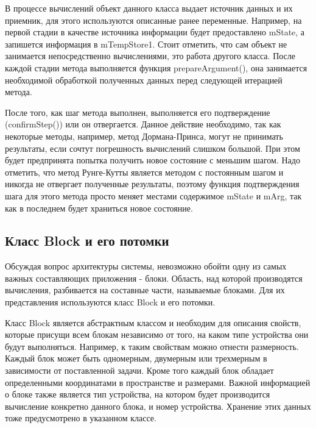 \documentclass[a4paper, 14pt]{extarticle}
\theoremstyle{definition}
\begin{document}
\par В процессе вычислений объект данного класса выдает источник данных и их приемник, для этого используются описанные ранее переменные. Например, на первой стадии в качестве источника информации будет предоставлено mState, а запишется информация в mTempStore1. Стоит отметить, что сам объект не занимается непосредственно вычислениями, это работа другого класса. После каждой стадии метода выполняется функция prepareArgument(), она занимается необходимой обработкой полученных данных перед следующей итерацией метода.

\par После того, как шаг метода выполнен, выполняется его подтверждение (confirmStep()) или он отвергается. Данное действие необходимо, так как некоторые методы, например, метод Дормана-Принса, могут не принимать результаты, если сочтут погрешность вычислений слишком большой. При этом будет предпринята попытка получить новое состояние с меньшим шагом. Надо отметить, что метод Рунге-Кутты является методом с постоянным шагом и никогда не отвергает полученные результаты, поэтому функция подтверждения шага для этого метода просто меняет местами содержимое mState и mArg, так как в последнем будет храниться новое состояние.



\subsection{Класс Block и его потомки}

\par Обсуждая вопрос архитектуры системы, невозможно обойти одну из самых важных составляющих приложения - блоки. Область, над которой производятся вычисления, разбивается на составные части, называемые блоками. Для их представления используются класс Block и его потомки.

\par Класс Block является абстрактным классом и необходим для описания свойств, которые присущи всем блокам независимо от того, на каком типе устройства они будут выполняться. Например, к таким свойствам можно отнести размерность. Каждый блок может быть одномерным, двумерным или трехмерным в зависимости от поставленной задачи. Кроме того каждый блок обладает определенными координатами в пространстве и размерами. Важной информацией о блоке также является тип устройства, на котором будет производится вычисление конкретно данного блока, и номер устройства. Хранение этих данных тоже предусмотрено в указанном классе.
\end{document}

